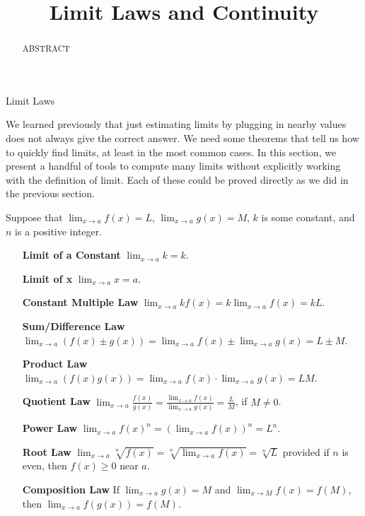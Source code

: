 \documentclass{ximera}
\title{Limit Laws and Continuity}
\begin{document}
\begin{abstract}

ABSTRACT

\end{abstract}
\maketitle

Limit Laws

We learned previously that just estimating limits by plugging in nearby values does not always give the correct answer.  We need some theorems that tell us how to quickly find limits, at least in the most common cases.  In this section, we present a handful of tools to compute many limits without explicitly working with the definition of limit. Each of these could be proved directly as we did in the previous section. 

\begin{theorem}\label{theorem:limit-laws}
Suppose that $\lim_{x\to a}f(x)=L$, $\lim_{x\to a}g(x)=M$, $k$
is some constant, and $n$ is a positive integer.
\begin{itemize}
\item[\textbf{Limit of a Constant}] $\lim_{x\to a} k = k$.
\item[\textbf{Limit of x}] $\lim_{x\to a}x =a$.
\item[\textbf{Constant Multiple Law}] $\lim_{x\to a} kf(x) = k\lim_{x\to a}f(x)=kL$.
\item[\textbf{Sum/Difference Law}] $\lim_{x\to a} (f(x) \pm g(x)) = \lim_{x\to a}f(x) \pm \lim_{x\to a}g(x)=L \pm M$.  
\item[\textbf{Product Law}] $\lim_{x\to a} (f(x)g(x)) = \lim_{x\to a}f(x)\cdot\lim_{x\to a}g(x)=LM$. 
\item[\textbf{Quotient Law}] $\lim_{x\to a} \frac{f(x)}{g(x)} =
  \frac{\lim_{x\to a}f(x)}{\lim_{x\to a}g(x)}=\frac{L}{M}$, if $M\ne0$.
\item[\textbf{Power Law}] $\lim_{x\to a} f(x)^n = \left(\lim_{x\to a}f(x)\right)^n=L^n$.
\item[\textbf{Root Law}] $\lim_{x\to a} \sqrt[n]{f(x)} = \sqrt[n]{\lim_{x\to
    a}f(x)}=\sqrt[n]{L}$ provided if $n$ is even, then $f(x)\ge 0$
  near $a$.
\item[\textbf{Composition Law}] If $\lim_{x\to a}g(x)=M$ and
  $\lim_{x\to M}f(x) = f(M)$, then $\lim_{x\to a} f(g(x)) = f(M)$.
\end{itemize}
\label{thm:limit laws}
\end{theorem}
\end{document}
